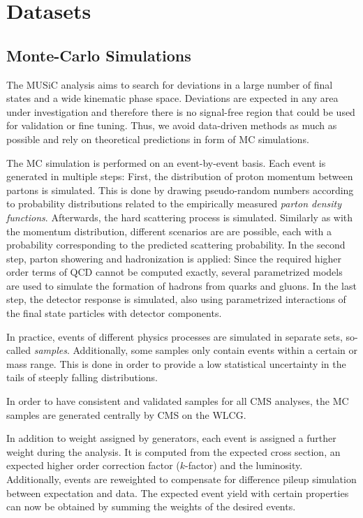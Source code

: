 
\chapter{Datasets}
\section{Monte-Carlo Simulations}
The \ac{MUSiC} analysis aims to search for deviations in a large number of final states and a wide kinematic phase space. Deviations are expected in any area under investigation and therefore there is no signal-free region that could be used for validation or fine tuning. Thus, we avoid data-driven methods as much as possible and rely on theoretical predictions in form of \acl{MC} simulations.

The \ac{MC} simulation is performed on an event-by-event basis. Each event is generated in multiple steps: First, the distribution of proton momentum between partons is simulated. This is done by drawing pseudo-random numbers according to probability distributions related to the empirically measured \emph{parton density functions}.
Afterwards, the hard scattering process is simulated. Similarly as with the momentum distribution, different scenarios are are possible, each with a probability corresponding to the predicted scattering probability. In the second step, parton showering and hadronization is applied: Since the required higher order terms of \ac{QCD} cannot be computed exactly, several parametrized models are used to simulate the formation of hadrons from quarks and gluons. In the last step, the detector response is simulated, also using parametrized interactions of the final state particles with detector components.

In practice, events of different physics processes are simulated in separate sets, so-called \emph{samples}. 
Additionally, some samples only contain events within a certain \pT or mass range. This is done in order to provide a low statistical uncertainty in the tails of steeply falling distributions.

In order to have consistent and validated samples for all \ac{CMS} analyses, the \ac{MC} samples are generated centrally by \ac{CMS} on the \ac{WLCG}.

In addition to weight assigned by generators, each event is assigned a further weight during the analysis. It is computed from the expected cross section, an expected higher order correction factor ($k$-factor) and the luminosity. 
Additionally, events are reweighted to compensate for difference pileup simulation between expectation and data. 
The expected event yield with certain properties can now be obtained by summing the weights of the desired events.

